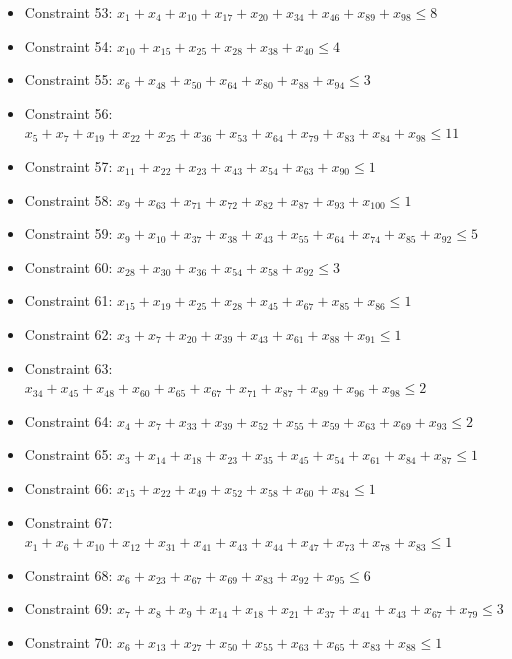 \documentclass[11pt]{article}
\begin{document}
\begin{itemize}
\item Constraint 53: $x_{1} + x_{4} + x_{10} + x_{17} + x_{20} + x_{34} + x_{46} + x_{89} + x_{98} \le 8$
\item Constraint 54: $x_{10} + x_{15} + x_{25} + x_{28} + x_{38} + x_{40} \le 4$
\item Constraint 55: $x_{6} + x_{48} + x_{50} + x_{64} + x_{80} + x_{88} + x_{94} \le 3$
\item Constraint 56: $x_{5} + x_{7} + x_{19} + x_{22} + x_{25} + x_{36} + x_{53} + x_{64} + x_{79} + x_{83} + x_{84} + x_{98} \le 11$
\item Constraint 57: $x_{11} + x_{22} + x_{23} + x_{43} + x_{54} + x_{63} + x_{90} \le 1$
\item Constraint 58: $x_{9} + x_{63} + x_{71} + x_{72} + x_{82} + x_{87} + x_{93} + x_{100} \le 1$
\item Constraint 59: $x_{9} + x_{10} + x_{37} + x_{38} + x_{43} + x_{55} + x_{64} + x_{74} + x_{85} + x_{92} \le 5$
\item Constraint 60: $x_{28} + x_{30} + x_{36} + x_{54} + x_{58} + x_{92} \le 3$
\item Constraint 61: $x_{15} + x_{19} + x_{25} + x_{28} + x_{45} + x_{67} + x_{85} + x_{86} \le 1$
\item Constraint 62: $x_{3} + x_{7} + x_{20} + x_{39} + x_{43} + x_{61} + x_{88} + x_{91} \le 1$
\item Constraint 63: $x_{34} + x_{45} + x_{48} + x_{60} + x_{65} + x_{67} + x_{71} + x_{87} + x_{89} + x_{96} + x_{98} \le 2$
\item Constraint 64: $x_{4} + x_{7} + x_{33} + x_{39} + x_{52} + x_{55} + x_{59} + x_{63} + x_{69} + x_{93} \le 2$
\item Constraint 65: $x_{3} + x_{14} + x_{18} + x_{23} + x_{35} + x_{45} + x_{54} + x_{61} + x_{84} + x_{87} \le 1$
\item Constraint 66: $x_{15} + x_{22} + x_{49} + x_{52} + x_{58} + x_{60} + x_{84} \le 1$
\item Constraint 67: $x_{1} + x_{6} + x_{10} + x_{12} + x_{31} + x_{41} + x_{43} + x_{44} + x_{47} + x_{73} + x_{78} + x_{83} \le 1$
\item Constraint 68: $x_{6} + x_{23} + x_{67} + x_{69} + x_{83} + x_{92} + x_{95} \le 6$
\item Constraint 69: $x_{7} + x_{8} + x_{9} + x_{14} + x_{18} + x_{21} + x_{37} + x_{41} + x_{43} + x_{67} + x_{79} \le 3$
\item Constraint 70: $x_{6} + x_{13} + x_{27} + x_{50} + x_{55} + x_{63} + x_{65} + x_{83} + x_{88} \le 1$

\end{itemize}
\end{document}
